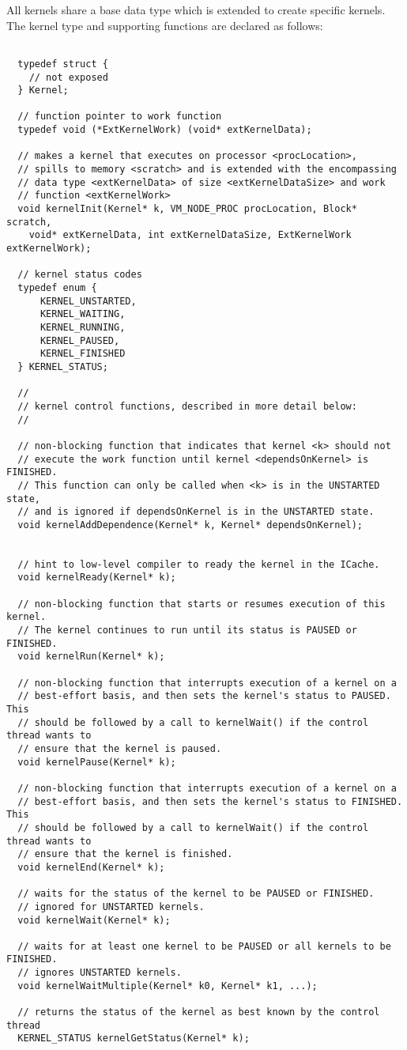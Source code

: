 
All kernels share a base data type which is extended to create
specific kernels. The kernel type and supporting functions are
declared as follows:

{\small
\begin{verbatim}

  typedef struct {
    // not exposed
  } Kernel;

  // function pointer to work function
  typedef void (*ExtKernelWork) (void* extKernelData);

  // makes a kernel that executes on processor <procLocation>,
  // spills to memory <scratch> and is extended with the encompassing
  // data type <extKernelData> of size <extKernelDataSize> and work
  // function <extKernelWork>
  void kernelInit(Kernel* k, VM_NODE_PROC procLocation, Block* scratch,
    void* extKernelData, int extKernelDataSize, ExtKernelWork extKernelWork);

  // kernel status codes
  typedef enum {
      KERNEL_UNSTARTED,
      KERNEL_WAITING,
      KERNEL_RUNNING,
      KERNEL_PAUSED,
      KERNEL_FINISHED
  } KERNEL_STATUS;

  //
  // kernel control functions, described in more detail below:
  //

  // non-blocking function that indicates that kernel <k> should not 
  // execute the work function until kernel <dependsOnKernel> is FINISHED.  
  // This function can only be called when <k> is in the UNSTARTED state,
  // and is ignored if dependsOnKernel is in the UNSTARTED state.
  void kernelAddDependence(Kernel* k, Kernel* dependsOnKernel);


  // hint to low-level compiler to ready the kernel in the ICache.
  void kernelReady(Kernel* k);

  // non-blocking function that starts or resumes execution of this kernel. 
  // The kernel continues to run until its status is PAUSED or FINISHED.
  void kernelRun(Kernel* k);

  // non-blocking function that interrupts execution of a kernel on a
  // best-effort basis, and then sets the kernel's status to PAUSED.  This 
  // should be followed by a call to kernelWait() if the control thread wants to
  // ensure that the kernel is paused.
  void kernelPause(Kernel* k);

  // non-blocking function that interrupts execution of a kernel on a 
  // best-effort basis, and then sets the kernel's status to FINISHED.  This 
  // should be followed by a call to kernelWait() if the control thread wants to
  // ensure that the kernel is finished.
  void kernelEnd(Kernel* k);

  // waits for the status of the kernel to be PAUSED or FINISHED.
  // ignored for UNSTARTED kernels.
  void kernelWait(Kernel* k);

  // waits for at least one kernel to be PAUSED or all kernels to be FINISHED.
  // ignores UNSTARTED kernels.
  void kernelWaitMultiple(Kernel* k0, Kernel* k1, ...);

  // returns the status of the kernel as best known by the control thread
  KERNEL_STATUS kernelGetStatus(Kernel* k);
\end{verbatim}}


